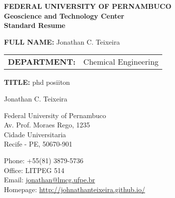 \documentclass[12pt,letterpaper]{article}
\makeatletter
\let\saved@bibitem\@bibitem %
\def\HCode#1{}
\def\name{Jonathan C. Teixeira}
\makeatother
\begin{document}
\sloppy

\begingroup
\makeatletter
\let\@bibitem\saved@bibitem %
\endgroup

\ifdefined\isinstitutional
  \begin{center}
    \textbf{FEDERAL UNIVERSITY OF PERNAMBUCO\\ Geoscience and Technology Center \\ 
Standard Resume}
  \end{center}

  \bigskip

  \begin{minipage}[t]{0.7\textwidth}
    \textbf{\large FULL NAME:} Jonathan C. Teixeira \\
    \begin{tabular}{@{}ll}
      \textbf{\large DEPARTMENT:} & Chemical Engineering
    \end{tabular}
  \end{minipage}
  \begin{minipage}[t]{0.3\textwidth}
      \textbf{\large TITLE:} phd posiiton 
  \end{minipage}
\else
  \HCode{<div class="fluid-container"}

  \HCode{<div style="margin: 0 auto; overflow: hidden; width: 960px">} %
  \HCode{<div style="display: inline; float: left; margin: 0 10px; overflow: hidden; width: 820px">} %
  \HCode{<h1>}
  {\huge \name}
  \HCode{</h1>}
  \HCode{</div>} %
  \HCode{</div>} %

  \bigskip

  \HCode{<div class="row">}
  \HCode{<div class="col-md-4">}
  \begin{minipage}[t]{0.5\textwidth}
    Federal University of Pernambuco \\
    Av. Prof. Moraes Rego, 1235 \\
    Cidade Universitaria\\
    Recife - PE, 50670-901 \\
  \end{minipage}
  \HCode{</div>} %
  \HCode{<div class="col-md-8">}
  \begin{minipage}[t]{0.5\textwidth}
    Phone: +55(81) 3879-5736 \\
    Office: LITPEG 514 \\
  \ifdefined\ispdf
    Email: \href{mailto:jonta.teixeira@gmail.com}{jonathan@lmcg.ufpe.br} \\
  \fi
    Homepage: 
\href{http://jontateixeira.github.io/index.html}{http://johnathanteixeira.github.io/}
  \end{minipage}
  \HCode{</div>} %
  \HCode{</div>} %
\end{document}
